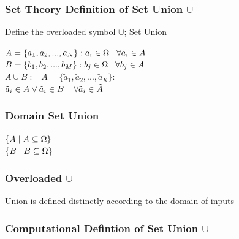 \documentclass[11pt]{article}
\begin{document}
\subsubsection{Set Theory Definition of Set Union $\cup$}
Define the overloaded symbol $\cup$; Set Union
\begin{center}
\vspace{2mm}
$
A = \{a_1,a_2,...,a_N\} : a_i \in \Omega \hspace{3mm} \forall a_i \in A
$
\\ \vspace{2mm}
$
B = \{b_1,b_2,...,b_M\} : b_j \in \Omega \hspace{3mm} \forall b_j \in A
$
\\ \vspace{4mm}
$
A \cup B := \tilde{A} = \{\tilde{a}_1,\tilde{a}_2,...,\tilde{a}_K\}:
$
\\ \vspace{2mm}
$
\tilde{a}_i \in A \lor \tilde{a}_i \in B \hspace{4mm} \forall \tilde{a}_i \in \tilde{A}
$
\end{center}





\subsubsection{Domain Set Union}
\begin{center}
$
\{ A \hspace{1mm} | \hspace{1mm} A \subseteq \Omega\}
$
\\ \vspace{2mm}
$
\{ B \hspace{1mm}|\hspace{1mm} B \subseteq \Omega\}
$
\end{center}



\subsubsection{Overloaded $\cup$}
Union is defined distinctly according to the domain of inputs


\subsubsection{Computational Defintion of Set Union $\cup$}
\end{document}
